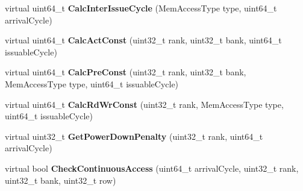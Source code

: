 \begin{DoxyCompactItemize}
\item 
\hypertarget{classMemChannelBase_a004618cbad63872b77f73fb46507ae88}{virtual uint64\-\_\-t {\bfseries Calc\-Inter\-Issue\-Cycle} (Mem\-Access\-Type type, uint64\-\_\-t arrival\-Cycle)}\label{classMemChannelBase_a004618cbad63872b77f73fb46507ae88}

\item 
\hypertarget{classMemChannelBase_a9808754c103a7cb6700d19176db56826}{virtual uint64\-\_\-t {\bfseries Calc\-Act\-Const} (uint32\-\_\-t rank, uint32\-\_\-t bank, uint64\-\_\-t issuable\-Cycle)}\label{classMemChannelBase_a9808754c103a7cb6700d19176db56826}

\item 
\hypertarget{classMemChannelBase_aa3596a5a18c951ca3df722459589e7bd}{virtual uint64\-\_\-t {\bfseries Calc\-Pre\-Const} (uint32\-\_\-t rank, uint32\-\_\-t bank, Mem\-Access\-Type type, uint64\-\_\-t issuable\-Cycle)}\label{classMemChannelBase_aa3596a5a18c951ca3df722459589e7bd}

\item 
\hypertarget{classMemChannelBase_aabd0c4decaa154fca93cd7809cd5eae5}{virtual uint64\-\_\-t {\bfseries Calc\-Rd\-Wr\-Const} (uint32\-\_\-t rank, Mem\-Access\-Type type, uint64\-\_\-t issuable\-Cycle)}\label{classMemChannelBase_aabd0c4decaa154fca93cd7809cd5eae5}

\item 
\hypertarget{classMemChannelBase_a94f245dd5873c65df9b97901a7339e1f}{virtual uint32\-\_\-t {\bfseries Get\-Power\-Down\-Penalty} (uint32\-\_\-t rank, uint64\-\_\-t arrival\-Cycle)}\label{classMemChannelBase_a94f245dd5873c65df9b97901a7339e1f}

\item 
\hypertarget{classMemChannelBase_a3e58cb7900f1ee33c067f09285ef8e81}{virtual bool {\bfseries Check\-Continuous\-Access} (uint64\-\_\-t arrival\-Cycle, uint32\-\_\-t rank, uint32\-\_\-t bank, uint32\-\_\-t row)}\label{classMemChannelBase_a3e58cb7900f1ee33c067f09285ef8e81}

\end{DoxyCompactItemize}
